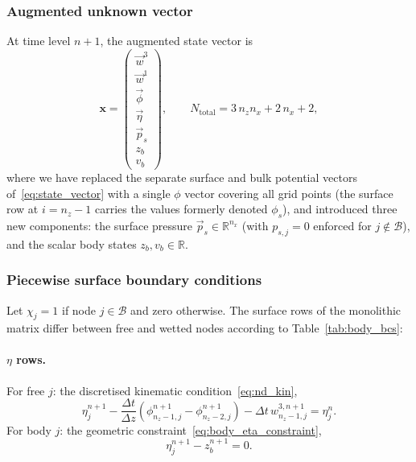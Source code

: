 \documentclass{article}
\newcommand{\xx}{\mathbf{x}}
\begin{document}
\subsubsection{Augmented unknown vector}

At time level $n+1$, the augmented state vector is
\begin{equation}
    \xx = \begin{pmatrix} \vec{w}^3 \\ \vec{w}^1 \\ \vec{\phi} \\ \vec{\eta} \\ \vec{p}_s \\ z_b \\ v_b \end{pmatrix}, \qquad N_{\mathrm{total}} = 3\,n_z n_x + 2\,n_x + 2,
    \label{eq:augmented_state}
\end{equation}
where we have replaced the separate surface and bulk potential vectors of~\eqref{eq:state_vector} with a single $\phi$ vector covering all grid points (the surface row at $i = n_z - 1$ carries the values formerly denoted $\phi_s$), and introduced three new components: the surface pressure $\vec{p}_s \in \mathbb{R}^{n_x}$ (with $p_{s,j} = 0$ enforced for $j \notin \mathcal{B}$), and the scalar body states $z_b, v_b \in \mathbb{R}$.

\subsubsection{Piecewise surface boundary conditions}

Let $\chi_j = 1$ if node $j \in \mathcal{B}$ and zero otherwise.
The surface rows of the monolithic matrix differ between free and wetted nodes according to Table~\ref{tab:body_bcs}:

\paragraph{$\eta$ rows.}
For free $j$: the discretised kinematic condition~\eqref{eq:nd_kin},
\begin{equation}
    \eta_j^{n+1} - \frac{\Delta t}{\Delta z}\left(\phi_{n_z-1,j}^{n+1} - \phi_{n_z-2,j}^{n+1}\right) - \Delta t\, w^{3,n+1}_{n_z-1,j} = \eta_j^n.
\end{equation}
For body $j$: the geometric constraint~\eqref{eq:body_eta_constraint},
\begin{equation}
    \eta_j^{n+1} - z_b^{n+1} = 0.
\end{equation}
\end{document}
